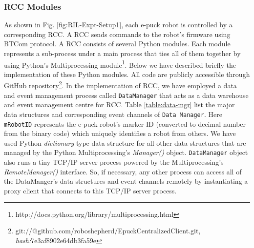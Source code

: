 \documentclass[journal]{IEEEtran}
\begin{document}
\subsubsection{RCC Modules}
As shown in Fig. \ref{fig:RIL-Expt-Setup1}, each e-puck robot is controlled by a corresponding RCC. A RCC sends commands to the robot's firmware using BTCom protocol. A RCC consists of several Python modules. Each module represents a sub-process under a main process that ties all of them together by using Python's Multiprocessing module\footnote{http://docs.python.org/library/multiprocessing.html}. Below we have described briefly the implementation of these Python modules. All code are publicly accessible through GitHub repository\footnote{git://@github.com/roboshepherd/EpuckCentralizedClient.git,    
\textit{hash:}7e3af8902e64db3fa59e}.
In the implementation of RCC, we have employed a data and event management process called \texttt{DataManager} that acts as a data warehouse and event management centre for RCC. Table \ref{table:data-mgr} list the major data structures and corresponding event channels of \texttt{Data Manager}. Here \texttt{mRobotID} represents the e-puck robot's marker ID (converted to decimal number from the binary code) which uniquely identifies a robot from others.  We have used Python {\em dictionary} type data structure for all other data structures that are managed by the Python Multiprocessing's {\em Manager()} object.  \texttt{DataManager} object also runs a tiny TCP/IP server process powered by the Multiprocessing's {\em RemoteManager()} interface. So, if necessary,  any other process can access all of the DataManger's data structures and event channels remotely by instantiating a proxy client  that connects to this TCP/IP server process.
\end{document}
